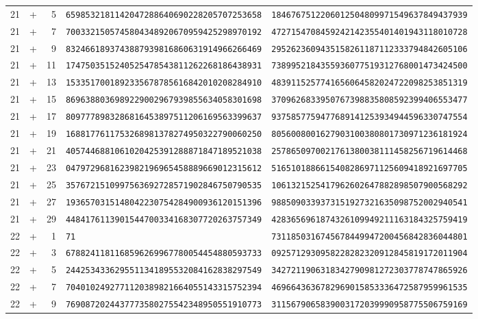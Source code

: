 \begin{longtable}{@{}rcrll@{}}
21&+&5&\texttt{6598532181142047288640690228205707253658}&\texttt{1846767512206012504809971549637849437939}\\
21&+&7&\texttt{7003321505745804348920670959425298970192}&\texttt{4727154708459242142355401401943118010728}\\
21&+&9&\texttt{8324661893743887939816860631914966266469}&\texttt{2952623609435158261187112333794842605106}\\
21&+&11&\texttt{1747503515240525478543811262268186438931}&\texttt{7389952184355936077519312768001473424500}\\
21&+&13&\texttt{1533517001892335678785616842010208284910}&\texttt{4839115257741656064582024722098253851319}\\
21&+&15&\texttt{8696388036989229002967939855634058301698}&\texttt{3709626833950767398835808592399406553477}\\
21&+&17&\texttt{8097778983286816453897511206169563399637}&\texttt{9375857759477689141253934944596330747554}\\
21&+&19&\texttt{1688177611753268981378274950322790060250}&\texttt{8056008001627903100380801730971236181924}\\
21&+&21&\texttt{4057446881061020425391288871847189521038}&\texttt{2578650970021761380038111458256719614468}\\
21&+&23&\texttt{0479729681623982196965458889669012315612}&\texttt{5165101886615408286971125609418921697705}\\
21&+&25&\texttt{3576721510997563692728571902846750790535}&\texttt{1061321525417962602647882898507900568292}\\
21&+&27&\texttt{1936570315148042230754284900936120151396}&\texttt{9885090339373151927321635098752002940541}\\
21&+&29&\texttt{4484176113901544700334168307720263757349}&\texttt{4283656961874326109949211163184325759419}\\
22&+&1&\texttt{71}&\texttt{7311850316745678449947200456842836044801}\\
22&+&3&\texttt{6788241181168596269967780054454880593733}&\texttt{0925712930958228282320912845819172011904}\\
22&+&5&\texttt{2442534336295511341895532084162838297549}&\texttt{3427211906318342790981272303778747865926}\\
22&+&7&\texttt{7040102492771120389821664055143315752394}&\texttt{4696643636782969015853336472587959961535}\\
22&+&9&\texttt{7690872024437773580275542348950551910773}&\texttt{3115679065839003172039990958775506759169}\\

\end{longtable}
